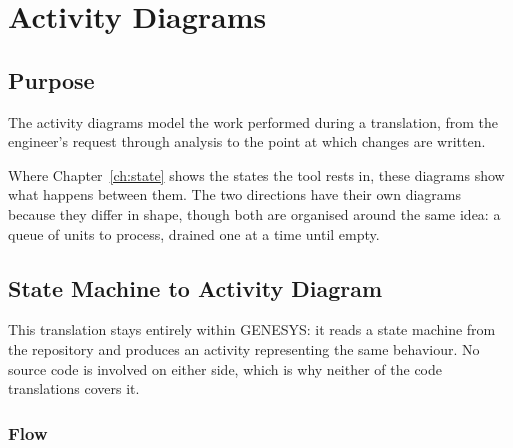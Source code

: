 \chapter{Activity Diagrams}
\label{ch:activity}

\section{Purpose}

The activity diagrams model the work performed during a translation, from the
engineer's request through analysis to the point at which changes are written.

Where Chapter~\ref{ch:state} shows the states the tool rests in, these diagrams
show what happens between them. The two directions have their own diagrams
because they differ in shape, though both are organised around the same idea: a
queue of units to process, drained one at a time until empty.

\section{State Machine to Activity Diagram}
\label{sec:sa-activity}

This translation stays entirely within GENESYS: it reads a state machine from the
repository and produces an activity representing the same behaviour. No source
code is involved on either side, which is why neither of the code translations
covers it.


\subsection{Flow}

